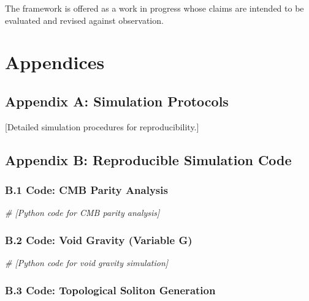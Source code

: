\documentclass[
  11pt,
]{article}
\newenvironment{Shaded}{}{}
\newcommand{\CommentTok}[1]{\textcolor[rgb]{0.38,0.63,0.69}{\textit{#1}}}
\begin{document}
The framework is offered as a work in progress whose claims are intended
to be evaluated and revised against observation.

\section{Appendices}\label{appendices}

\subsection{Appendix A: Simulation
Protocols}\label{appendix-a-simulation-protocols}

{[}Detailed simulation procedures for reproducibility.{]}

\subsection{Appendix B: Reproducible Simulation
Code}\label{appendix-b-reproducible-simulation-code}

\subsubsection{B.1 Code: CMB Parity
Analysis}\label{b.1-code-cmb-parity-analysis}

\begin{Shaded}
\begin{Highlighting}[]
\CommentTok{\# [Python code for CMB parity analysis]}
\end{Highlighting}
\end{Shaded}

\subsubsection{B.2 Code: Void Gravity (Variable
G)}\label{b.2-code-void-gravity-variable-g}

\begin{Shaded}
\begin{Highlighting}[]
\CommentTok{\# [Python code for void gravity simulation]}
\end{Highlighting}
\end{Shaded}

\subsubsection{B.3 Code: Topological Soliton
Generation}\label{b.3-code-topological-soliton-generation}
\end{document}
